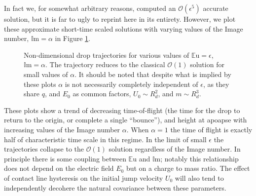 \documentclass[12pt,a4paper,oneside]{book}
\begin{document}
In fact we, for somewhat arbitrary reasons, computed an $\mathcal{O}(\epsilon^5)$ accurate solution, but it is far to ugly to reprint here in its entirety. However, we plot these approximate short-time scaled solutions with varying values of the Image number, $\mathbb{I}\mbox{m} = \alpha$ in Figure \ref{fig:short_times}.
\begin{figure}[htb]
    \centering
    \resizebox{1\textwidth}{!}{}
    \caption{Non-dimensional drop trajectories for various values of $\mathbb{E}\mbox{u}=\epsilon$, $\mathbb{I}\mbox{m}=\alpha$. The trajectory reduces to the classical $\mathcal{O}(1)$ solution for small values of $\alpha$. It should be noted that despite what is implied by these plots $\alpha$ is not necessarily completely independent of $\epsilon$, as they share $q$, and $E_0$ as common factors, $U_0 \sim R_d^2$, and $m \sim R_d^3$.}
    \label{fig:short_times}
\end{figure}
These plots show a trend of decreasing time-of-flight (the time for the drop to return to the origin, or complete a single ``bounce''), and height at apoapse with increasing values of the Image number $\alpha$. When $\alpha = 1$ the time of flight is exactly half of characteristic time scale in this regime. In the limit of small $\epsilon$ the trajectories collapse to the $\mathcal{O}(1)$ solution regardless of the Image number. In principle there is some coupling between $\mathbb{E}\mbox{u}$ and $\mathbb{I}\mbox{m}$; notably this relationship does not depend on the electric field $E_0$ but on a charge to mass ratio. The effect of contact line hysteresis on the initial jump velocity $U_0$ will also tend to independently decohere the natural covariance between these parameters.
\end{document}

